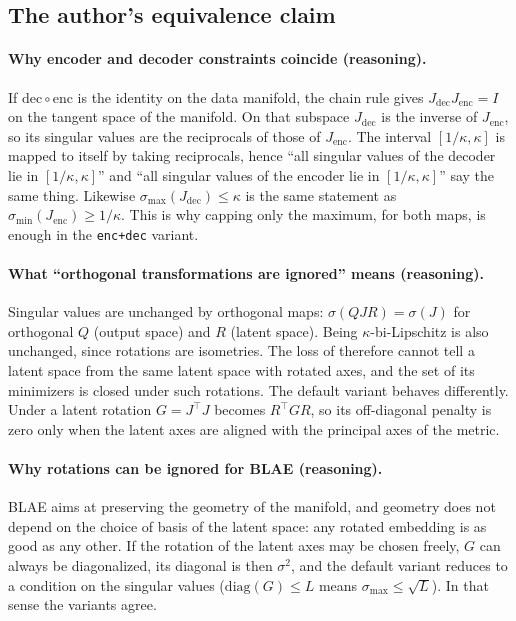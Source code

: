 \subsection{The author's equivalence claim}
\label{app:bilip:claim}

\paragraph{Why encoder and decoder constraints coincide (reasoning).}
If $\mathrm{dec}\circ\mathrm{enc}$ is the identity on the data manifold, the chain
rule gives $J_{\mathrm{dec}}J_{\mathrm{enc}}=I$ on the tangent space of the manifold.
On that subspace $J_{\mathrm{dec}}$ is the inverse of $J_{\mathrm{enc}}$, so its
singular values are the reciprocals of those of $J_{\mathrm{enc}}$. The interval
$[1/\kappa,\kappa]$ is mapped to itself by taking reciprocals, hence ``all singular
values of the decoder lie in $[1/\kappa,\kappa]$'' and ``all singular values of the
encoder lie in $[1/\kappa,\kappa]$'' say the same thing. Likewise
$\sigma_{\max}(J_{\mathrm{dec}})\le\kappa$ is the same statement as
$\sigma_{\min}(J_{\mathrm{enc}})\ge1/\kappa$. This is why capping only the maximum,
for
both maps, is enough in the \texttt{enc+dec} variant.

\paragraph{What ``orthogonal transformations are ignored'' means (reasoning).}
Singular values are unchanged by orthogonal maps: $\sigma(QJR)=\sigma(J)$ for
orthogonal
$Q$ (output space) and $R$ (latent space). Being $\kappa$-bi-Lipschitz is also
unchanged, since rotations are isometries. The loss of \cite[Eq.~(12)]{zhan2026blae} therefore 
cannot tell a latent space from the same latent space with rotated axes, and the set of its
minimizers is closed under such rotations. The default variant behaves differently. Under a
latent rotation $G=J^\top J$ becomes $R^\top GR$, so its off-diagonal penalty is zero
only when the latent axes are aligned with the principal axes of the metric.

\paragraph{Why rotations can be ignored for BLAE (reasoning).}
BLAE aims at preserving the geometry of the manifold, and geometry does not depend on
the choice of basis of the latent space: any rotated embedding is as good as any
other. If the rotation of the latent axes may be chosen freely, $G$ can always be
diagonalized, its diagonal is then $\sigma^2$, and the default variant reduces to a
condition on the singular values ($\mathrm{diag}(G)\le L$ means $\sigma_{\max}\le
\sqrt{L}$). In that sense the variants agree.

